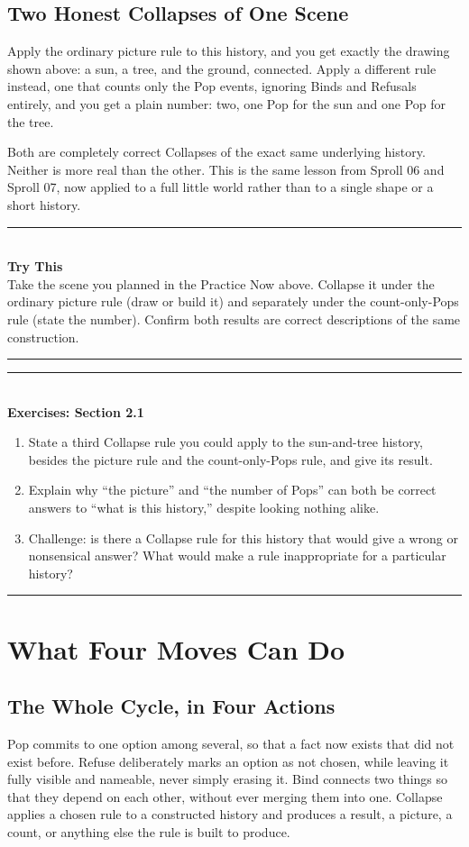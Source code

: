 \documentclass[11pt]{book}
\newenvironment{exercisebox}[1]{\vspace{0.8em}\noindent\rule{\linewidth}{0.6pt}\\[0.2em]\textbf{Exercises: #1}\\[0.3em]\begin{enumerate}[label=\arabic*., itemsep=0.4em]}{\end{enumerate}\noindent\rule{\linewidth}{0.6pt}\vspace{0.6em}}
\newenvironment{trythis}{\vspace{0.6em}\noindent\rule{\linewidth}{0.6pt}\\[0.2em]\textbf{Try This}\\[0.3em]}{\\[0.2em]\noindent\rule{\linewidth}{0.6pt}\vspace{0.6em}}
\begin{document}
\section{Two Honest Collapses of One Scene}

Apply the ordinary picture rule to this history, and you get exactly the drawing shown above: a sun, a tree, and the ground, connected. Apply a different rule instead, one that counts only the Pop events, ignoring Binds and Refusals entirely, and you get a plain number: two, one Pop for the sun and one Pop for the tree.

Both are completely correct Collapses of the exact same underlying history. Neither is more real than the other. This is the same lesson from Sproll 06 and Sproll 07, now applied to a full little world rather than to a single shape or a short history.

\begin{trythis}
Take the scene you planned in the Practice Now above. Collapse it under the ordinary picture rule (draw or build it) and separately under the count-only-Pops rule (state the number). Confirm both results are correct descriptions of the same construction.
\end{trythis}

\begin{exercisebox}{Section 2.1}
\item State a third Collapse rule you could apply to the sun-and-tree history, besides the picture rule and the count-only-Pops rule, and give its result.
\item Explain why ``the picture'' and ``the number of Pops'' can both be correct answers to ``what is this history,'' despite looking nothing alike.
\item Challenge: is there a Collapse rule for this history that would give a wrong or nonsensical answer? What would make a rule inappropriate for a particular history?
\end{exercisebox}

\chapter{What Four Moves Can Do}

\section{The Whole Cycle, in Four Actions}

Pop commits to one option among several, so that a fact now exists that did not exist before. Refuse deliberately marks an option as not chosen, while leaving it fully visible and nameable, never simply erasing it. Bind connects two things so that they depend on each other, without ever merging them into one. Collapse applies a chosen rule to a constructed history and produces a result, a picture, a count, or anything else the rule is built to produce.
\end{document}
